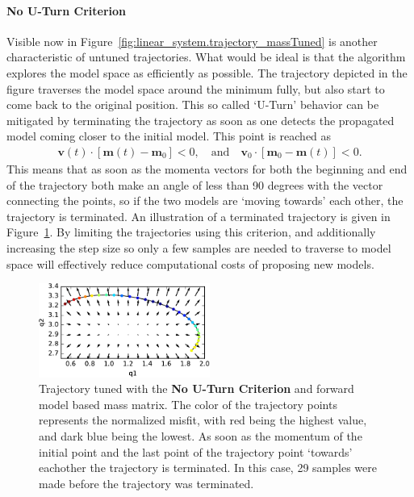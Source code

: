 \paragraph{No U-Turn Criterion}Visible now in Figure~\ref{fig:linear_system.trajectory_massTuned} is another characteristic of untuned trajectories. What would be ideal is that the algorithm explores the model space as efficiently as possible. The trajectory depicted in the figure traverses the model space around the minimum fully, but also start to come back to the original position. This so called `U-Turn' behavior can be mitigated by terminating the trajectory as soon as one detects the propagated model coming closer to the initial model. This point is reached as
\begin{gather}
	  \mathbf{v}(t) \cdot \left[ \mathbf{m}(t) - \mathbf{m}_0 \right] < 0, \quad
	 \text{and} \quad
	 \mathbf{v}_0\cdot \left[ \mathbf{m}_0 - \mathbf{m}(t) \right] < 0.
\end{gather}
This means that as soon as the momenta vectors for both the beginning and end of the trajectory both make an angle of less than 90 degrees with the vector connecting the points, so if the two models are `moving towards' each other, the trajectory is terminated. An illustration of a terminated trajectory is given in Figure~\ref{fig:linear_system.trajectory_uTurn}. By limiting the trajectories using this criterion, and additionally increasing the step size so only a few samples are needed to traverse to model space will effectively reduce computational costs of proposing new models.

\begin{figure}
	\centering
	
	\includegraphics[width=0.5\textwidth]{figures/linear_systems/trajectory_uTurn_29_samples}
	
	\caption{Trajectory tuned with the \textbf{No U-Turn Criterion} and forward model based mass matrix. The color of the trajectory points represents the normalized misfit, with red being the highest value, and dark blue being the lowest. As soon as the momentum of the initial point and the last point of the trajectory point `towards' eachother the trajectory is terminated. In this case, 29 samples were made before the trajectory was terminated.}
	\label{fig:linear_system.trajectory_uTurn}
\end{figure}

